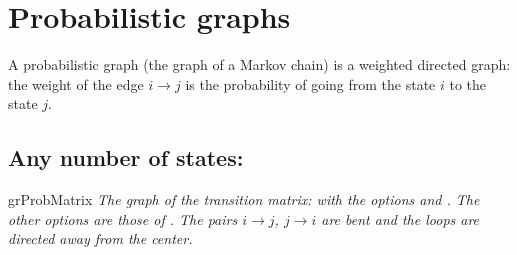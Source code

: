 \section{Probabilistic graphs}
A probabilistic graph (the graph of a Markov chain) is a weighted directed
graph: the weight of the edge $i\to j$ is the probability of going from the
state $i$ to the state $j$.

\subsection{Any number of states: }
\begin{NewMacroBox}{grProbMatrix}{}
\emph{The graph of the transition matrix: 
with the options  and . The other
options are those of . The pairs
$i\to j$, $j\to i$ are bent and the loops are directed away from the
center.}
\end{NewMacroBox}

\begin{tkzexample}[latex=7cm,small]
\end{tkzexample}

\begin{tkzexample}[latex=7cm,small]
\end{tkzexample}

\newpage

